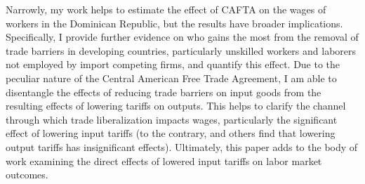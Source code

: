 Narrowly, my work helps to estimate the effect of CAFTA on the wages of workers in the 
Dominican Republic, but the results have broader implications. Specifically, 
I provide further evidence on who gains the most from the removal of trade barriers in developing
countries, particularly unskilled workers and laborers not employed by import competing firms,
and quantify this effect. Due to the peculiar nature
of the Central American Free Trade Agreement, I am able to disentangle the effects
of reducing trade barriers on input goods from the resulting effects of lowering tariffs on outputs.
This helps to clarify the channel through which trade liberalization impacts wages, particularly
the significant effect of lowering input tariffs (to the contrary, \citet{amiti2012trade} and others 
find that lowering output tariffs has insignificant effects). 
Ultimately, this paper adds to the body of work examining the direct effects of lowered 
input  tariffs on labor market outcomes.

